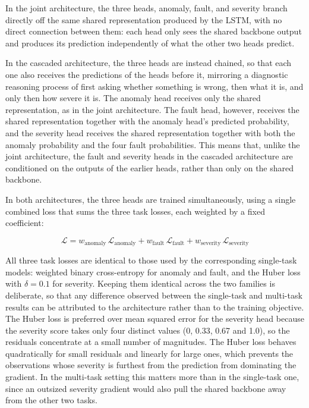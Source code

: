 In the joint architecture, the three heads, anomaly, fault, and severity branch directly off the same 
shared representation produced by the LSTM, with no direct connection between them: each head only sees 
the shared backbone output and produces its prediction independently of what the other two heads predict.

In the cascaded architecture, the three heads are instead chained, so that each one also receives the 
predictions of the heads before it, mirroring a diagnostic reasoning process of first asking whether 
something is wrong, then what it is, and only then how severe it is. The anomaly head receives only the 
shared representation, as in the joint architecture. The fault head, however, receives the shared 
representation together with the anomaly head's predicted probability, and the severity head receives the 
shared representation together with both the anomaly probability and the four fault probabilities. This 
means that, unlike the joint architecture, the fault and severity heads in the cascaded architecture are 
conditioned on the outputs of the earlier heads, rather than only on the shared backbone.

In both architectures, the three heads are trained simultaneously, using a single combined loss that sums
the three task losses, each weighted by a fixed coefficient:

\begin{equation}
\mathcal{L} = w_{\text{anomaly}} \, \mathcal{L}_{\text{anomaly}} + w_{\text{fault}} \, \mathcal{L}_{\text{fault}} + w_{\text{severity}} \, \mathcal{L}_{\text{severity}}
\end{equation}

All three task losses are identical to those used by the corresponding single-task models: weighted
binary cross-entropy for anomaly and fault, and the Huber loss with $\delta = 0.1$ for severity. Keeping
them identical across the two families is deliberate, so that any difference observed between the
single-task and multi-task results can be attributed to the architecture rather than to the training
objective. The Huber loss is preferred over mean squared error for the severity head because the severity
score takes only four distinct values (0, 0.33, 0.67 and 1.0), so the residuals concentrate at a small
number of magnitudes. The Huber loss behaves quadratically for small residuals and linearly for large
ones, which prevents the observations whose severity is furthest from the prediction from dominating the
gradient. In the multi-task setting this matters more than in the single-task one, since an outsized
severity gradient would also pull the shared backbone away from the other two tasks.

